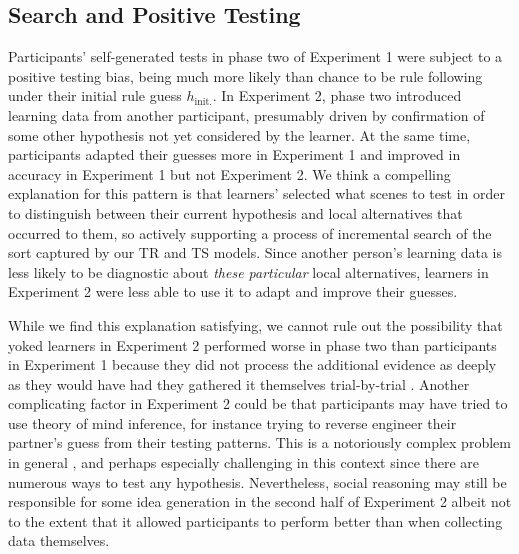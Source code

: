 \documentclass[doc,natbib,floatsintext]{apa7}
\newcommand{\hi}{h_{\mathrm{init.}}}
\begin{document}
\subsection{Search and Positive Testing}
Participants' self-generated tests in phase two of Experiment 1 were subject to a positive testing bias, being much more likely than chance to be rule following under their initial rule guess $\hi$. In Experiment 2, phase two introduced learning data from another participant, presumably driven by confirmation of some other hypothesis not yet considered by the learner. At the same time, participants adapted their guesses more in Experiment 1 and improved in accuracy in Experiment 1 but not Experiment 2. We think a compelling explanation for this pattern is that learners' selected what scenes to test in order to distinguish between their current hypothesis and local alternatives that occurred to them, so actively supporting a process of incremental search of the sort captured by our TR and TS models. Since another person's learning data is less likely to be diagnostic about \emph{these particular} local alternatives, learners in Experiment 2 were less able to use it to adapt and improve their guesses.

While we find this explanation satisfying, we cannot rule out the possibility that yoked learners in Experiment 2 performed worse in phase two than participants in Experiment 1 because they did not process the additional evidence as deeply as they would have had they gathered it themselves trial-by-trial \citep{ruggeri2016active}. Another complicating factor in Experiment 2 could be that participants may have tried to use theory of mind inference, for instance trying to reverse engineer their partner's guess from their testing patterns. This is a notoriously complex problem in general \citep{wu2021representational, shafto2012learning,jara2016naive,hawthorne2019reasoning, wu2021representational}, and perhaps especially challenging in this context since there are numerous ways to test any hypothesis. Nevertheless, social reasoning may still be responsible for some idea generation in the second half of Experiment 2 albeit not to the extent that it allowed participants to perform better than when collecting data themselves. 
\end{document}
